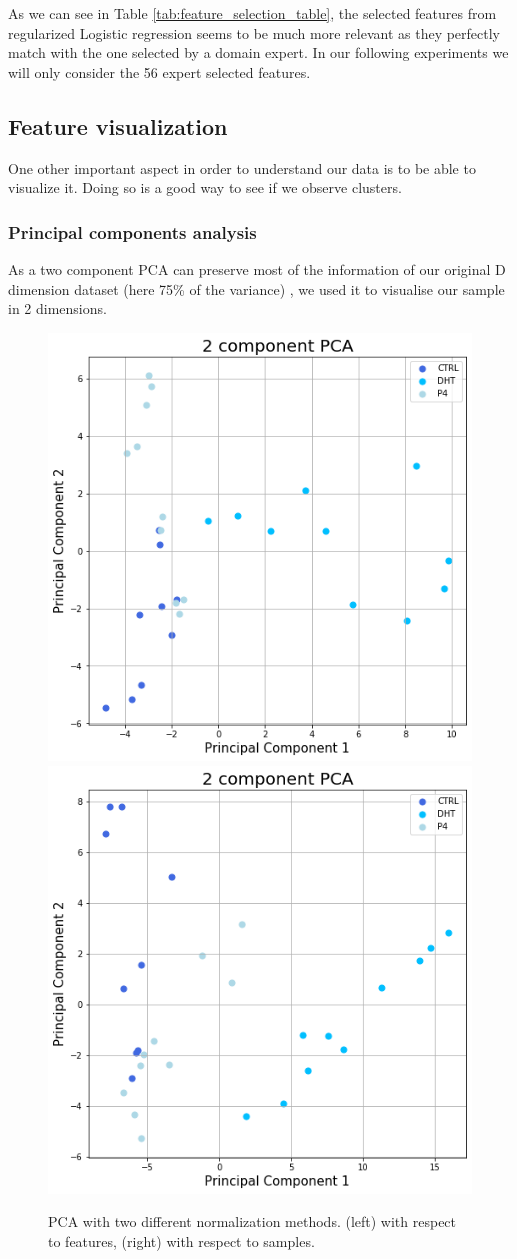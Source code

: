 \documentclass[10pt,conference,compsocconf]{IEEEtran}
\begin{document}
As we can see in Table \ref{tab:feature_selection_table}, the selected features from regularized Logistic regression seems to be much more relevant as they perfectly match with the one selected by a domain expert. In our following experiments we will only consider the 56 expert selected features.

\subsection{Feature visualization}

One other important aspect in order to understand our data is to be able to visualize it. Doing so is a good way to see if we observe clusters.

\subsubsection{Principal components analysis}

As a two component PCA can preserve most of the information of our original D dimension dataset (here 75\% of the variance) , we used it to visualise our sample in 2 dimensions.

\begin{figure}[H]
    \centering
    \includegraphics[width=0.48\columnwidth]{figures/PCA_feature_normalized.png}
    \includegraphics[width=0.48\columnwidth]{figures/PCA_sample_normalized.png}
    \caption{PCA with two different normalization methods. (left) with respect to features, (right) with respect to samples.}
    \label{fig:pca}
\end{figure}
\end{document}
